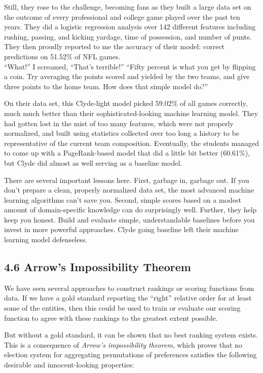 \documentclass[10pt]{article}
\begin{document}
Still, they rose to the challenge, becoming fans as they built a large data set on the outcome of every professional and college game played over the past ten years. They did a logistic regression analysis over 142 different features including rushing, passing, and kicking yardage, time of possession, and number of punts. They then proudly reported to me the accuracy of their model: correct predictions on 51.52\% of NFL games.\\ “What!” I screamed, “That’s terrible!” “Fifty percent is what you get by flipping a coin. Try averaging the points scored and yielded by the two teams, and give three points to the home team. How does that simple model do?”

On their data set, this Clyde-light model picked 59.02\% of all games correctly, much much better than their sophisticated-looking machine learning model. They had gotten lost in the mist of too many features, which were not properly normalized, and built using statistics collected over too long a history to be representative of the current team composition. Eventually, the students managed to come up with a PageRank-based model that did a little bit better (60.61\%), but Clyde did almost as well serving as a baseline model.

There are several important lessons here. First, garbage in, garbage out. If you don’t prepare a clean, properly normalized data set, the most advanced machine learning algorithms can’t save you. Second, simple scores based on a modest amount of domain-specific knowledge can do surprisingly well. Further, they help keep you honest. Build and evaluate simple, understandable baselines before you invest in more powerful approaches. Clyde going baseline left their machine learning model defenseless.

\subsection*{4.6 Arrow’s Impossibility Theorem}
We have seen several approaches to construct rankings or scoring functions from data. If we have a gold standard reporting the “right” relative order for at least some of the entities, then this could be used to train or evaluate our scoring function to agree with these rankings to the greatest extent possible.

But without a gold standard, it can be shown that no best ranking system exists. This is a consequence of \textit{Arrow’s impossibility theorem}, which proves that no election system for aggregating permutations of preferences satisfies the following desirable and innocent-looking properties:
\end{document}
